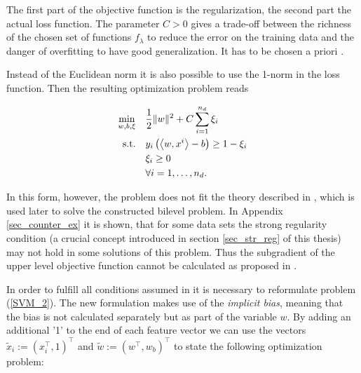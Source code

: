 The first part of the objective function is the regularization, the second part the actual loss function. 
The parameter \(C > 0\) gives a trade-off between the richness of the chosen set of functions \(f_{\lambda}\) to reduce the error on the training data and the danger of overfitting to have good generalization. It has to be chosen a priori \cite{Kunapuli2008}.

Instead of the Euclidean norm it is also possible to use the 1-norm in the loss function. Then the resulting optimization problem reads

\begin{align}
\begin{split}
	\min_{w,b,\xi} \quad & \frac{1}{2} \|w\|^2+C\sum_{i=1}^{n_d}{\xi_i} \\
	\text{s.t.} \quad & y_i\left(\left\langle w,x^i\right\rangle-b\right) \geq 1 - \xi_i \\
	& \xi_i \geq 0 \\
	& 	\forall i = 1, \dots , n_d.
\end{split}
\label{SVM_1}
\end{align}

In this form, however, the problem does not fit the theory described in \cite{Outrata1998}, which is used later to solve the constructed bilevel problem. In Appendix \ref{sec_counter_ex} it is shown, that for some data sets the strong regularity condition (a crucial concept introduced in section \ref{sec_str_reg} of this thesis) may not hold in some solutions of this problem. Thus the subgradient of the upper level objective function cannot be calculated as proposed in \cite{Outrata1998}.


In order to fulfill all conditions assumed in \cite{Outrata1998} it is necessary to reformulate problem (\ref{SVM_2}).
The new formulation makes use of the \emph{implicit bias}, meaning that the bias is not calculated separately but as part of the variable \(w\). 
By adding an additional '1' to the end of each feature vector we can use the vectors \(\tilde{x}_i := (x_i^{\top},1)^{\top}\) and \(\tilde{w} := (w^{\top},w_b)^{\top}\) to state the following optimization problem:

